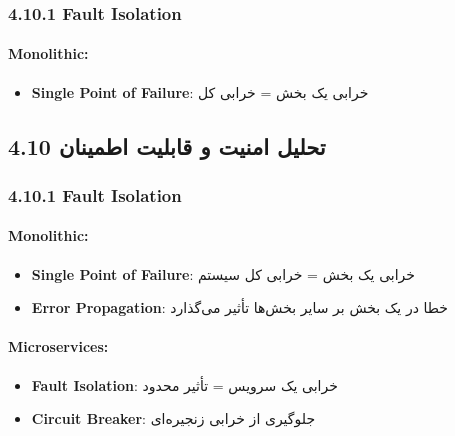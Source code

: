 \documentclass[
]{article}
\providecommand{\tightlist}{%
  \setlength{\itemsep}{0pt}\setlength{\parskip}{0pt}}
\begin{document}
\subsubsection{4.10.1 Fault Isolation}\label{fault-isolation}

\paragraph{Monolithic:}\label{monolithic}

\begin{itemize}
\tightlist
\item
  \textbf{Single Point of Failure}: خرابی یک بخش = خرابی کل
\end{itemize}

\subsection{4.10 تحلیل امنیت و قابلیت
اطمینان}\label{ux62aux62dux644ux6ccux644-ux627ux645ux646ux6ccux62a-ux648-ux642ux627ux628ux644ux6ccux62a-ux627ux637ux645ux6ccux646ux627ux646-1}

\subsubsection{4.10.1 Fault Isolation}\label{fault-isolation-1}

\paragraph{Monolithic:}\label{monolithic-1}

\begin{itemize}
\tightlist
\item
  \textbf{Single Point of Failure}: خرابی یک بخش = خرابی کل سیستم
\item
  \textbf{Error Propagation}: خطا در یک بخش بر سایر بخش‌ها تأثیر می‌گذارد
\end{itemize}

\paragraph{Microservices:}\label{microservices}

\begin{itemize}
\tightlist
\item
  \textbf{Fault Isolation}: خرابی یک سرویس = تأثیر محدود
\item
  \textbf{Circuit Breaker}: جلوگیری از خرابی زنجیره‌ای
\end{itemize}
\end{document}
